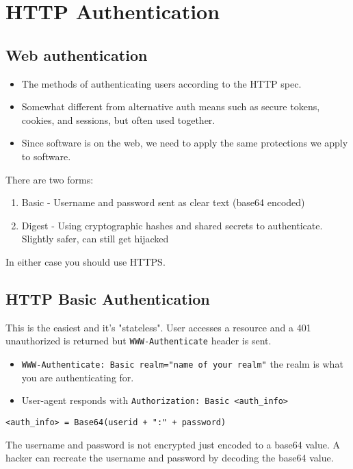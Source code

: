 \documentclass[../CMPUT-404-Notes.tex]{subfiles}
\begin{document}
\chapter{HTTP Authentication}
\section{Web authentication}
\begin{itemize}
  \item  The methods of authenticating users according to the HTTP spec.
  \item  Somewhat different from alternative auth means such as secure tokens, cookies, and sessions, but often used together.
  \item  Since software is on the web, we need to apply the same protections we apply to software.
\end{itemize}

There are two forms:
\begin{enumerate}
  \item Basic - Username and password sent as clear text (base64 encoded)
  \item Digest - Using cryptographic hashes and shared secrets to authenticate. Slightly safer, can still get hijacked
\end{enumerate}
In either case you should use HTTPS.

\section{HTTP Basic Authentication}
This is the easiest and it's "stateless". 
User accesses a resource and a 401 unauthorized is returned but \texttt{WWW-Authenticate} header is sent.
\begin{itemize}
  \item \texttt{WWW-Authenticate: Basic realm="name of your realm"} the realm is what you are authenticating for.
  \item User-agent responds with \texttt{Authorization: Basic <auth_info>}
\end{itemize}
\begin{listing}[!h]
\begin{verbatim}
<auth_info> = Base64(userid + ":" + password)
\end{verbatim}
\end{listing}

\begin{Note}
  The username and password is not encrypted just encoded to a base64 value. A hacker can recreate the username and password by decoding the base64 value.
\end{Note}
\end{document}
